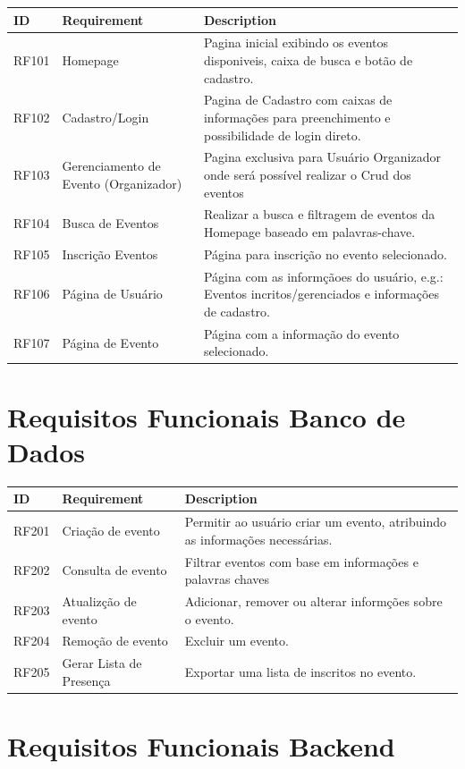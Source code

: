\begin{tabular}{>{\raggedright}p{1.5cm}>{\raggedright}p{4cm}>{\raggedright}p{10cm}}
\toprule
\textbf{ID} & \textbf{Requirement} & \textbf{Description} \tabularnewline 
\midrule
  RF101 & Homepage & Pagina inicial exibindo os eventos disponiveis, caixa de busca e botão de cadastro.\tabularnewline \hline
  RF102 & Cadastro/Login & Pagina de Cadastro com caixas de informações para preenchimento e possibilidade de login direto.\tabularnewline \hline
  RF103 & Gerenciamento de Evento (Organizador) & Pagina exclusiva para Usuário Organizador onde será possível realizar o Crud dos eventos\tabularnewline \hline 
  RF104 & Busca de Eventos & Realizar a busca e filtragem de eventos da Homepage baseado em palavras-chave.\tabularnewline \hline
  RF105 & Inscrição Eventos & Página para inscrição no evento selecionado.\tabularnewline \hline
  RF106 & Página de Usuário & Página com as informçãoes do usuário, e.g.: Eventos incritos/gerenciados e informações de cadastro.\tabularnewline \hline
  RF107 & Página de Evento & Página com a informação do evento selecionado.\tabularnewline
\bottomrule
\end{tabular}

\section{Requisitos Funcionais Banco de Dados}
\begin{tabular}{>{\raggedright}p{1.5cm}>{\raggedright}p{4cm}>{\raggedright}p{10cm}}
\toprule
\textbf{ID} & \textbf{Requirement} & \textbf{Description} \tabularnewline 
\midrule
  RF201 & Criação de evento & Permitir ao usuário criar um evento, atribuindo as informações necessárias.\tabularnewline \hline
  RF202 & Consulta de evento & Filtrar eventos com base em informações e palavras chaves\tabularnewline \hline
  RF203 & Atualizção de evento & Adicionar, remover ou alterar informções sobre o evento.\tabularnewline \hline
  RF204 & Remoção de evento & Excluir um evento.\tabularnewline \hline
  RF205 & Gerar Lista de Presença & Exportar uma lista de inscritos no evento.\tabularnewline 
\bottomrule
\end{tabular}

\section{Requisitos Funcionais Backend}

